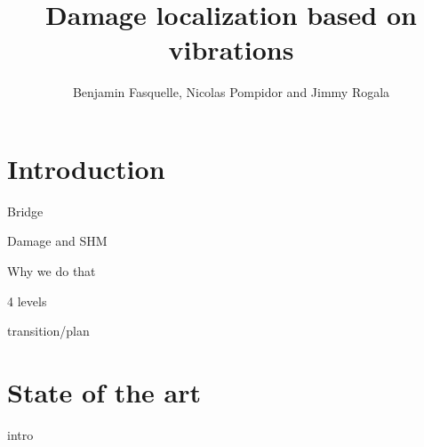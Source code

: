 \documentclass{beamer}
\title{Damage localization based on vibrations}
\author{Benjamin Fasquelle, Nicolas Pompidor and Jimmy Rogala}
\institute{École Normale Supérieure de Rennes, département Informatique et Télécommunications}
\begin{document}




  \begin{frame}
  \titlepage
  \end{frame}




\section{Introduction}

\begin{frame}{Bridge}
\end{frame}


\begin{frame}{Damage and SHM}
\end{frame}


\begin{frame}{Why we do that}
\end{frame}


\begin{frame}{4 levels}
\end{frame}


\begin{frame}{transition/plan}
\end{frame}


\section{State of the art}


\begin{frame}{intro}
\end{frame}
\end{document}
